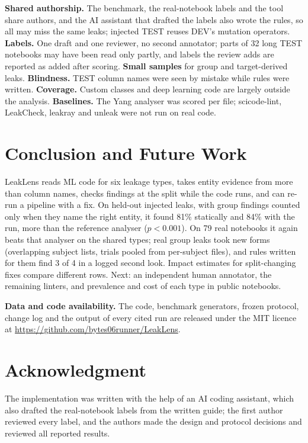 \documentclass[conference]{IEEEtran}
\newcommand{\tool}{LeakLens}
\begin{document}
\textbf{Shared authorship.} The benchmark, the real-notebook labels and the tool share authors, and the AI assistant
that drafted the labels also wrote the rules, so all may miss the same leaks; injected TEST reuses DEV's mutation
operators. \textbf{Labels.} One draft and one reviewer, no second annotator; parts of 32 long TEST notebooks may
have been read only partly, and labels the review adds are reported as added after scoring. \textbf{Small samples} for group and target-derived leaks.
\textbf{Blindness.} TEST column names were seen by mistake while rules were written. \textbf{Coverage.} Custom
classes and deep learning code are largely outside the analysis. \textbf{Baselines.} The Yang analyser was scored per file;
scicode-lint, LeakCheck, leakray and unleak were not run on real code.

\section{Conclusion and Future Work}

\tool{} reads ML code for six leakage types, takes entity evidence from more than column names, checks findings at
the split while the code runs, and can re-run a pipeline with a fix. On held-out injected leaks, with group findings
counted only when they name the right entity, it found 81\% statically and 84\% with the run, more than the
reference analyser ($p<0.001$). On 79 real notebooks it again beats that analyser on the shared types; real group
leaks took new forms (overlapping subject lists, trials pooled from per-subject files), and rules written for them
find 3 of 4 in a logged second look. Impact estimates for split-changing fixes compare different rows. Next: an independent human annotator, the remaining linters, and prevalence and cost of each
type in public notebooks.

\textbf{Data and code availability.} The code, benchmark generators, frozen protocol, change log and the output of
every cited run are released under the MIT licence at \url{https://github.com/bytes06runner/LeakLens}.

\section*{Acknowledgment}

The implementation was written with the help of an AI coding assistant, which also drafted the real-notebook
labels from the written guide; the first author reviewed every label, and the authors made the design and
protocol decisions and reviewed all reported results.



\end{document}
